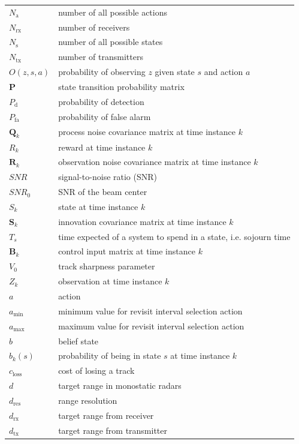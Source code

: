 \documentclass[english, 12pt, a4paper, elec, utf8, a-1b, online]{aaltothesis}
\numberwithin{equation}{section}
\newcommand{\amax}{a_\text{max}}
\newcommand{\amin}{a_\text{min}}
\newcommand{\sno}{SNR_0}
\renewcommand{\vec}[1]{\mathbf{#1}}
\newcommand{\Op}{O}
\newcommand{\cimodel}{\vec{B}_k}
\newcommand{\ocov}{\vec{R}_k}
\newcommand{\pcov}{\vec{Q}_k}
\newcommand{\innocov}{\vec{S}_k}
\newcommand{\stprobs}{\vec{P}}
\newcommand{\nacts}{{N_\text{a}}}
\newcommand{\nstates}{{N_\text{s}}}
\newcommand{\closs}{c_\text{loss}}
\begin{document}
\begin{longtable}[l]{ll}
$\nacts$ & number of all possible actions \\
$N_\text{rx}$ & number of receivers \\
$\nstates$ & number of all possible states \\
$N_\text{tx}$ & number of transmitters \\
$\Op(z, s, a)$ & probability of observing $z$ given state $s$ and action $a$ \\
$\stprobs$ & state transition probability matrix \\
$P_\text{d}$ & probability of detection \\
$P_\text{fa}$ & probability of false alarm \\
$\pcov$ & process noise covariance matrix at time instance $k$\\
$R_k$ & reward at time instance $k$ \\
$\ocov$ & observation noise covariance matrix at time instance $k$\\
$SNR$ & signal-to-noise ratio (SNR) \\
$\sno$ & SNR of the beam center \\
$S_k$ & state at time instance $k$ \\
$\innocov$ & innovation covariance matrix at time instance $k$ \\
$T_s$ & time expected of a system to spend in a state, i.e. sojourn time \\
$\cimodel$ & control input matrix at time instance $k$\\
$V_0$ & track sharpness parameter \\
$Z_k$ & observation at time instance $k$ \\
$a$ & action \\
$\amin$ & minimum value for revisit interval selection action \\
$\amax$ & maximum value for revisit interval selection action \\
$b$ & belief state \\
$b_k(s)$ & probability of being in state $s$ at time instance $k$ \\
$\closs$ & cost of losing a track \\
$d$ & target range in monostatic radars \\
$d_\text{res}$ & range resolution \\
$d_\text{rx}$ & target range from receiver \\
$d_\text{tx}$ & target range from transmitter \\

\end{longtable}
\end{document}
